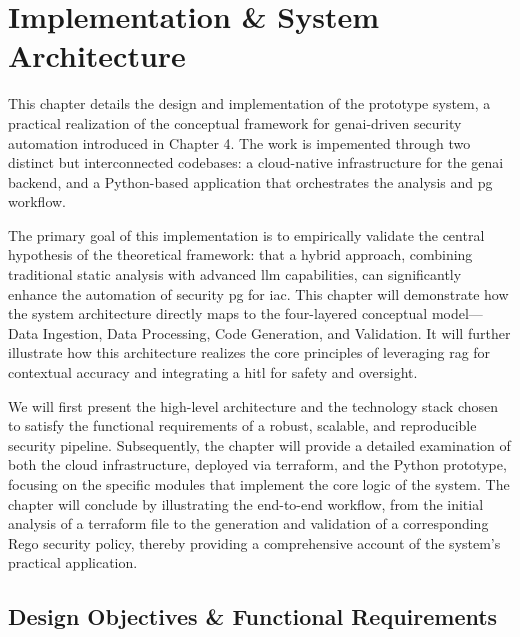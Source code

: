 \chapter{Implementation \& System Architecture}


This chapter details the design and implementation of the prototype system, a practical realization of the conceptual framework for \gls{genai}-driven security automation introduced in Chapter 4. The work is impemented through two distinct but interconnected codebases: a cloud-native infrastructure for the \gls{genai} backend, and a Python-based application that orchestrates the analysis and \gls{pg} workflow.

The primary goal of this implementation is to empirically validate the central hypothesis of the theoretical framework: that a hybrid approach, combining traditional static analysis with advanced \gls{llm} capabilities, can significantly enhance the automation of security \gls{pg} for \gls{iac}. This chapter will demonstrate how the system architecture directly maps to the four-layered conceptual model—Data Ingestion, Data Processing, Code Generation, and Validation. It will further illustrate how this architecture realizes the core principles of leveraging \gls{rag} for contextual accuracy and integrating a \gls{hitl} for safety and oversight.

We will first present the high-level architecture and the technology stack chosen to satisfy the functional requirements of a robust, scalable, and reproducible security pipeline. Subsequently, the chapter will provide a detailed examination of both the cloud infrastructure, deployed via \gls{terraform}, and the Python prototype, focusing on the specific modules that implement the core logic of the system. The chapter will conclude by illustrating the end-to-end workflow, from the initial analysis of a \gls{terraform} file to the generation and validation of a corresponding Rego security policy, thereby providing a comprehensive account of the system's practical application.

\section{Design Objectives \& Functional Requirements}



